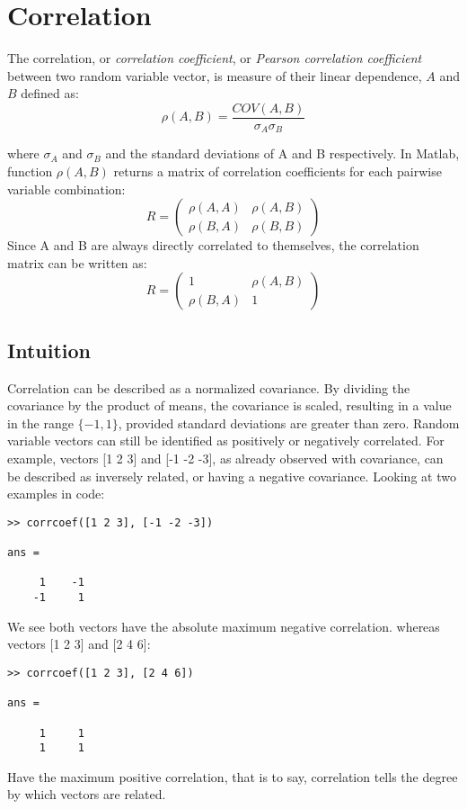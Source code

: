 \section{Correlation}

The correlation, or \textit{correlation coefficient}, or \textit{Pearson correlation coefficient}  between two random variable vector, is measure of their linear dependence, $A$ and $B$ defined as:
\begin{equation}
\rho(A,B) = \frac{COV(A,B)}{\sigma_A \sigma_B} \label{correlation}    
\end{equation}


where $\sigma_A$ and $\sigma_B$ and the standard deviations of A and B respectively. In Matlab, function $\rho(A,B)$ returns a matrix of correlation coefficients for each pairwise variable combination:
$$
R = 
\begin{pmatrix}
\rho(A,A) & \rho(A,B)\\
\rho(B,A) & \rho(B,B)
\end{pmatrix}
$$
Since A and B are always directly correlated to themselves, the correlation matrix can be written as:
$$
R = 
\begin{pmatrix}
1 & \rho(A,B)\\
\rho(B,A) & 1
\end{pmatrix}
$$
\subsection{Intuition}
Correlation can be described as a normalized covariance. By dividing the covariance by the product of means, the covariance is scaled, resulting in a value in the range $\{-1,1\}$, provided standard deviations are greater than zero.  
Random variable vectors can still be identified as positively or negatively correlated. For example, vectors [1 2 3] and [-1 -2 -3], as already observed with covariance, can be described as inversely related, or having a negative covariance. Looking at two examples in code:
\begin{verbatim}
>> corrcoef([1 2 3], [-1 -2 -3])

ans =

     1    -1
    -1     1
\end{verbatim}
We see both vectors have the absolute maximum negative correlation. whereas vectors [1 2 3] and [2 4 6]:
\begin{verbatim}
>> corrcoef([1 2 3], [2 4 6])

ans =

     1     1
     1     1
\end{verbatim}
Have the maximum positive correlation, that is to say, correlation tells the degree by which vectors are related.

